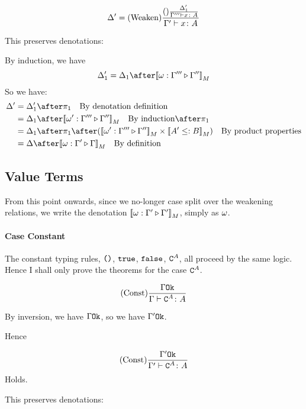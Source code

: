{        \begin{equation}
            \Delta' = (\text{Weaken}) \frac{(\text{}) \frac{\Delta_1'}{\Gamma''' \vdash x \colon A}}{\Gamma' \vdash x \colon A}
        \end{equation}

        This preserves denotations:

        By induction, we have
        \begin{equation}
            \D_1' = \D_1 \after \deno{\wrel{\w}{\G'''}{\G''}}
        \end{equation}
        So we have:
        \begin{align}
            \D' &= \D_1' \after \p\qt{By denotation definition}\\
            & = \D_1\after\deno{\wrel{\w'}{\G'''}{\G''}}\qt{By induction}\after\p \\
            & = \D_1\after\p\after(\deno{\wrel{\w'}{\G'''}{\G''}}\times\deno{A' \subtype B})\qt{By product properties}\\
            & = \D\after\deno{\wrel{\w}{\G'}{\G}}\qt{By definition}
        \end{align}

    \subsection{Value Terms}
    From this point onwards, since we no-longer case split over the weakening relations, we write the denotation ${\bf [\![}\omega : \Gamma' \triangleright \Gamma'{\bf ]\!]}_M$, simply as $\omega$.


    \paragraph{Case Constant}
    The constant typing rules, $\texttt{()}$, $\texttt{true}$, $\texttt{false}$, $\texttt{C}^{A}$, all proceed by the same logic. Hence I shall only prove the theorems for the case $\texttt{C}^{A}$.

    \begin{equation}
        (\text{Const}) \frac{\Gamma \texttt{Ok}}{\Gamma \vdash \texttt{C}^{A} \colon A}
    \end{equation}

    By inversion, we have $\Gamma \texttt{Ok}$, so we have $\Gamma' \texttt{Ok}$.

    Hence

    \begin{equation}
        (\text{Const}) \frac{\Gamma' \texttt{Ok}}{\Gamma' \vdash \texttt{C}^{A} \colon A}
    \end{equation}
    Holds.

    This preserves denotations:


}
